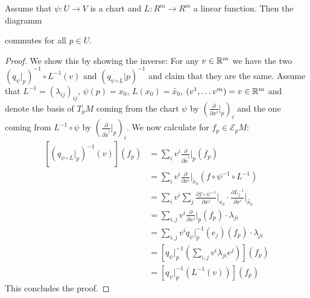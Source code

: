 \begin{lemma} \label{lem: linear chart change and tangend basis change}
	Assume that $\psi:U\to V$ is a chart and $L:R^m\to R^m$ a linear function.
	Then the diagramm \begin{center}
	\end{center}  
	commutes for all $p\in U$.
\end{lemma}
\begin{proof}
	We show this by showing the inverse: For any $v\in \mathbb{R}^m$ we have the two $(q_{\psi} \big|_p)^{-1} \circ  L^{-1}(v)$ and $(q_{\psi \circ L}\big|p)^{-1}$ and claim that they are the same. Assume that $L^{-1}=(\lambda_{ij})_{ij}$, $\psi(p)=x_0$, $L(x_0)=\tilde{x_0}$, $(v^1,\dots v^m)=v\in \mathbb{R}^m$ and denote the basis of $T_pM$ coming from the chart $\psi$ by $\left(\frac{\partial}{\partial x^i}\big|_p \right)_i$ and the one coming from $L^{-1}\circ \psi$ by $\left(\frac{\partial}{\partial \tilde{x}^i}\big|_p \right)_i$. We now calculate for $f_p\in \mathcal{E}_pM$:
	\begin{align*}
		\left[(q_{\psi \circ L}\big|_p)^{-1}(v)\right](f_p)
		&= \sum_i v^i \frac{\partial}{\partial \tilde{x}^i}\big|_p (f_p)  \\
		&=\sum_i v^i \frac{\partial}{\partial x^i}\big|_{\tilde{x}_0} (f\circ \psi^{-1}\circ L^{-1}) \\
		&=\sum_{i}v^i \sum_{j} \frac{\partial f\circ \psi^{-1}	}{\partial x^j}\big|_{x_0} \cdot \frac{\partial L^{-1}_j}{\partial x^i}\big|_{\tilde{x_0}}\\
		&= \sum_{i,j}v^i \frac{\partial }{\partial x^j}\big|_{p}(f_p) \cdot \lambda_{ji}\\
		&= \sum_{i,j}v^i q_{\psi}\big|_p^{-1}(e_j)(f_p) \cdot \lambda_{ji}\\
		&= \left[q_{\psi}\big|_p^{-1}(\sum_{i,j} v^i \lambda_{ji} e^j)\right](f_p)\\
		&= \left[q_{\psi}\big|_p^{-1}(L^{-1}(v))\right](f_p)
	\end{align*}
	This concludes the proof.
\end{proof}

